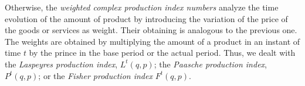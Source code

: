Otherwise, the \emph{weighted complex production index numbers} analyze the time evolution of the amount of product by introducing the variation of the price of the goods or services as weight. Their obtaining is analogous to the previous one.  The weights are obtained by multiplying the amount of a product in an instant of time $t$ by the prince in the base period or the actual period. Thus, we dealt with the \emph{Laspeyres production index}, $L^t(q,p)$; the \emph{Paasche production index}, $P^t(q,p)$; or the \emph{Fisher production index} $F^t(q,p)$.
%
%
%
%
%
%		 

